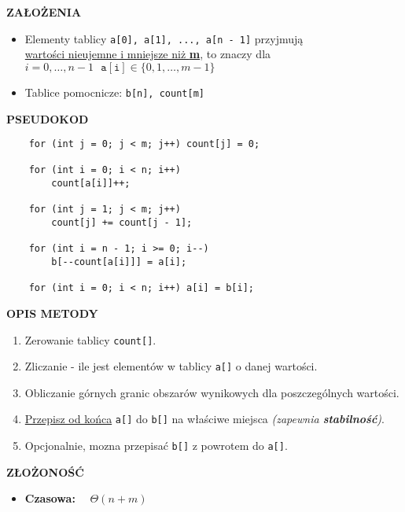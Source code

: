 \documentclass[advanced-sorts.tex]{subfiles}
\begin{document}
    \textbf{ZAŁOŻENIA}
    \begin{itemize}
        \item Elementy tablicy
            \texttt{a[0], a[1], ..., a[n - 1]} przyjmują\\
            \underline{wartości nieujemne i mniejsze niż \textbf{m}}, to znaczy
            dla\\ $i = 0, \ldots, n - 1  ~~~ \mathtt{a[i]} \in \{ 0, 1, \ldots, m - 1 \}$
        \item Tablice pomocnicze: \texttt{b[n], count[m]}
    \end{itemize}

    \textbf{PSEUDOKOD}
    \begin{verbatim}
    for (int j = 0; j < m; j++) count[j] = 0;

    for (int i = 0; i < n; i++)
        count[a[i]]++;

    for (int j = 1; j < m; j++)
        count[j] += count[j - 1];

    for (int i = n - 1; i >= 0; i--)
        b[--count[a[i]]] = a[i];

    for (int i = 0; i < n; i++) a[i] = b[i];
    \end{verbatim}

    \textbf{OPIS METODY}
    \begin{enumerate}
        \item Zerowanie tablicy \texttt{count[]}.
        \item Zliczanie - ile jest elementów w tablicy \texttt{a[]} o danej
            wartości.
        \item Obliczanie górnych granic obszarów wynikowych dla poszczególnych
            wartości.
        \item \underline{Przepisz od końca} \texttt{a[]} do \texttt{b[]} na
            właściwe miejsca \textit{(zapewnia \textbf{stabilność})}.
        \item Opcjonalnie, mozna przepisać \texttt{b[]} z powrotem do
            \texttt{a[]}.
    \end{enumerate}

    \textbf{ZŁOŻONOŚĆ}
    \begin{itemize}
        \item \textbf{Czasowa:} ~~$\Theta(n + m)$
    \end{itemize}
\end{document}
